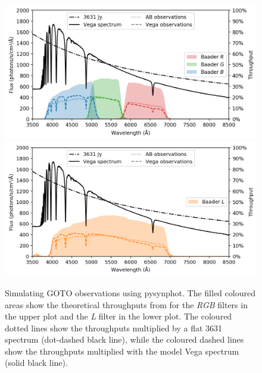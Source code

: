 \begin{colsection}
\begin{colsection}
\newpage

\begin{figure}[p]
    \begin{center}
        \includegraphics[width=\textwidth]{images/throughput/synphot_RGB.png}
        \includegraphics[width=\textwidth]{images/throughput/synphot_L.png}
    \end{center}
    \caption[Simulating photometric observations using pysynphot]{
        Simulating GOTO observations using pysynphot. The filled coloured areas show the theoretical throughputs from  for the \textit{RGB} filters in the upper plot and the \textit{L} filter in the lower plot. The coloured dotted lines show the throughputs multiplied by a flat \SI{3631}{\jansky} spectrum (dot-dashed black line), while the coloured dashed lines show the throughputs multiplied with the model Vega spectrum (solid black line).
    }\label{fig:pysynphot}
\end{figure}

\clearpage

\end{colsection}



\end{colsection}
